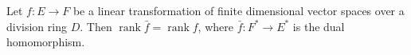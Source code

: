 Let $f : E \to F$ be a linear transformation of finite dimensional vector spaces over a division ring $D$. Then $\operatorname{rank} \bar{f} = \operatorname{rank} f$, where $\bar{f} : F^* \to E^*$ is the dual homomorphism.
